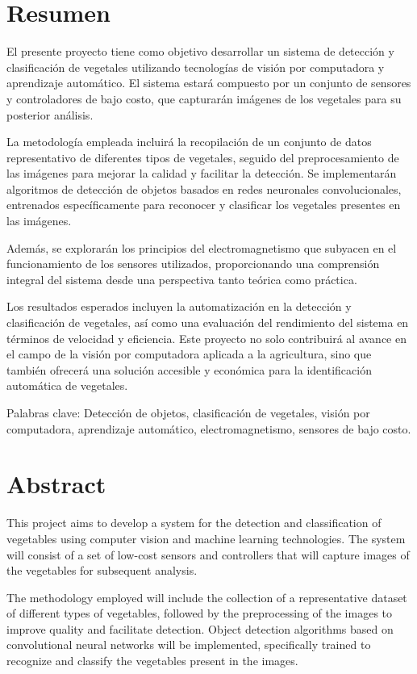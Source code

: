 \section{Resumen}

  El presente proyecto tiene como objetivo desarrollar un sistema de detección y clasificación de vegetales utilizando tecnologías de visión por computadora y aprendizaje automático. El sistema estará compuesto por un conjunto de sensores y controladores de bajo costo, que capturarán imágenes de los vegetales para su posterior análisis.

  La metodología empleada incluirá la recopilación de un conjunto de datos representativo de diferentes tipos de vegetales, seguido del preprocesamiento de las imágenes para mejorar la calidad y facilitar la detección. Se implementarán algoritmos de detección de objetos basados en redes neuronales convolucionales, entrenados específicamente para reconocer y clasificar los vegetales presentes en las imágenes.

  Además, se explorarán los principios del electromagnetismo que subyacen en el funcionamiento de los sensores utilizados, proporcionando una comprensión integral del sistema desde una perspectiva tanto teórica como práctica.

  Los resultados esperados incluyen la automatización en la detección y clasificación de vegetales, así como una evaluación del rendimiento del sistema en términos de velocidad y eficiencia. Este proyecto no solo contribuirá al avance en el campo de la visión por computadora aplicada a la agricultura, sino que también ofrecerá una solución accesible y económica para la identificación automática de vegetales.

  Palabras clave: Detección de objetos, clasificación de vegetales, visión por computadora, aprendizaje automático, electromagnetismo, sensores de bajo costo.

  \section{Abstract}
  This project aims to develop a system for the detection and classification of vegetables using computer vision and machine learning technologies. The system will consist of a set of low-cost sensors and controllers that will capture images of the vegetables for subsequent analysis.

  The methodology employed will include the collection of a representative dataset of different types of vegetables, followed by the preprocessing of the images to improve quality and facilitate detection. Object detection algorithms based on convolutional neural networks will be implemented, specifically trained to recognize and classify the vegetables present in the images.

